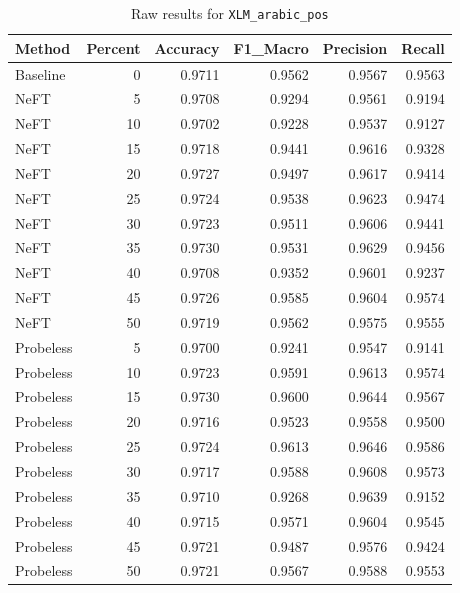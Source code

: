 \documentclass[12pt]{article}
\begin{document}
\begin{table}[H]
\centering
\caption{Raw results for \texttt{XLM\_arabic\_pos}}
\label{tab:xlm-arabic-pos}
\begin{tabular}{lrrrrr}
\toprule
Method & Percent & Accuracy & F1\_Macro & Precision & Recall \\
\midrule
Baseline & 0 & 0.9711 & 0.9562 & 0.9567 & 0.9563 \\
NeFT & 5 & 0.9708 & 0.9294 & 0.9561 & 0.9194 \\
NeFT & 10 & 0.9702 & 0.9228 & 0.9537 & 0.9127 \\
NeFT & 15 & 0.9718 & 0.9441 & 0.9616 & 0.9328 \\
NeFT & 20 & 0.9727 & 0.9497 & 0.9617 & 0.9414 \\
NeFT & 25 & 0.9724 & 0.9538 & 0.9623 & 0.9474 \\
NeFT & 30 & 0.9723 & 0.9511 & 0.9606 & 0.9441 \\
NeFT & 35 & 0.9730 & 0.9531 & 0.9629 & 0.9456 \\
NeFT & 40 & 0.9708 & 0.9352 & 0.9601 & 0.9237 \\
NeFT & 45 & 0.9726 & 0.9585 & 0.9604 & 0.9574 \\
NeFT & 50 & 0.9719 & 0.9562 & 0.9575 & 0.9555 \\
Probeless & 5 & 0.9700 & 0.9241 & 0.9547 & 0.9141 \\
Probeless & 10 & 0.9723 & 0.9591 & 0.9613 & 0.9574 \\
Probeless & 15 & 0.9730 & 0.9600 & 0.9644 & 0.9567 \\
Probeless & 20 & 0.9716 & 0.9523 & 0.9558 & 0.9500 \\
Probeless & 25 & 0.9724 & 0.9613 & 0.9646 & 0.9586 \\
Probeless & 30 & 0.9717 & 0.9588 & 0.9608 & 0.9573 \\
Probeless & 35 & 0.9710 & 0.9268 & 0.9639 & 0.9152 \\
Probeless & 40 & 0.9715 & 0.9571 & 0.9604 & 0.9545 \\
Probeless & 45 & 0.9721 & 0.9487 & 0.9576 & 0.9424 \\
Probeless & 50 & 0.9721 & 0.9567 & 0.9588 & 0.9553 \\
\bottomrule
\end{tabular}
\end{table}
\end{document}

